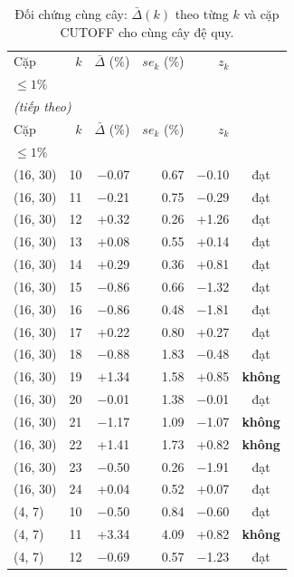 \footnotesize
\begin{longtable}{lrrrrc}
\caption{Đối chứng cùng cây: $\bar\Delta(k)$ theo từng $k$ và cặp CUTOFF cho cùng cây đệ quy.}\label{tab:h13}\\
\toprule
Cặp & $k$ & $\bar\Delta$ (\%) & $se_k$ (\%) & $z_k$ & \makecell{{$|\bar\Delta|$} \\ {$\le 1\%$}} \\
\midrule
\endfirsthead
\multicolumn{6}{l}{\textit{(tiếp theo)}}\\
\toprule
Cặp & $k$ & $\bar\Delta$ (\%) & $se_k$ (\%) & $z_k$ & \makecell{{$|\bar\Delta|$} \\ {$\le 1\%$}} \\
\midrule
\endhead
\bottomrule
\endlastfoot
(16, 30) & 10 & $-$0.07 & 0.67 & $-$0.10 & đạt \\
(16, 30) & 11 & $-$0.21 & 0.75 & $-$0.29 & đạt \\
(16, 30) & 12 & +0.32 & 0.26 & +1.26 & đạt \\
(16, 30) & 13 & +0.08 & 0.55 & +0.14 & đạt \\
(16, 30) & 14 & +0.29 & 0.36 & +0.81 & đạt \\
(16, 30) & 15 & $-$0.86 & 0.66 & $-$1.32 & đạt \\
(16, 30) & 16 & $-$0.86 & 0.48 & $-$1.81 & đạt \\
(16, 30) & 17 & +0.22 & 0.80 & +0.27 & đạt \\
(16, 30) & 18 & $-$0.88 & 1.83 & $-$0.48 & đạt \\
(16, 30) & 19 & +1.34 & 1.58 & +0.85 & \textbf{không} \\
(16, 30) & 20 & $-$0.01 & 1.38 & $-$0.01 & đạt \\
(16, 30) & 21 & $-$1.17 & 1.09 & $-$1.07 & \textbf{không} \\
(16, 30) & 22 & +1.41 & 1.73 & +0.82 & \textbf{không} \\
(16, 30) & 23 & $-$0.50 & 0.26 & $-$1.91 & đạt \\
(16, 30) & 24 & +0.04 & 0.52 & +0.07 & đạt \\
(4, 7) & 10 & $-$0.50 & 0.84 & $-$0.60 & đạt \\
(4, 7) & 11 & +3.34 & 4.09 & +0.82 & \textbf{không} \\
(4, 7) & 12 & $-$0.69 & 0.57 & $-$1.23 & đạt \\

\end{longtable}
